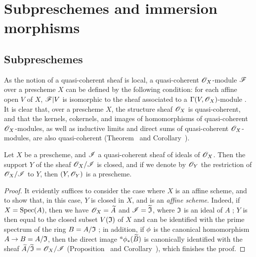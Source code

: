 \section{Subpreschemes and immersion morphisms}
\label{section-subpreschemes-and-immersion-morphisms}

\subsection{Subpreschemes}
\label{subsection-subpreschemes}

\begin{env}[4.1.1]
\label{1.4.1.1}
As the notion of a quasi-coherent sheaf  is local, a quasi-coherent $\mathscr{O}_X$-module $\mathscr{F}$ over a prescheme $X$ can be defined by the following condition: for each affine open $V$ of $X$, $\mathscr{F}|V$ is isomorphic to the sheaf associated to a $\Gamma(V,\mathscr{O}_X)$-module .
It is clear that, over a prescheme $X$, the structure sheaf $\mathscr{O}_X$ is quasi-coherent, and that the kernels, cokernels, and images of homomorphisms of quasi-coherent $\mathscr{O}_X$-modules, as well as inductive limits and direct sums of quasi-coherent $\mathscr{O}_X$-modules, are also quasi-coherent (Theorem~ and Corollary~).
\end{env}

\begin{prop}[4.1.2]
\label{1.4.1.2}
Let $X$ be a prescheme, and $\mathscr{I}$ a quasi-coherent sheaf of ideals of $\mathscr{O}_X$.
Then the support $Y$ of the sheaf $\mathscr{O}_X/\mathscr{I}$ is closed, and if we denote by $\mathscr{O}_Y$ the restriction of $\mathscr{O}_X/\mathscr{I}$ to $Y$, then $(Y,\mathscr{O}_Y)$ is a prescheme.
\end{prop}

\begin{proof}
\label{proof-1.4.1.2}
It evidently suffices  to consider the case where $X$ is an affine scheme, and to show that, in this case, $Y$ is closed in $X$, and is an \emph{affine scheme}.
Indeed, if $X={\mathop{\mathrm{Spec}}\nolimits}(A)$, then we have $\mathscr{O}_X={\widetilde{A}}$ and $\mathscr{I}={\widetilde{\mathfrak{I}}}$, where $\mathfrak{I}$ is an ideal of $A$ ;
$Y$ is then equal to the closed subset $V(\mathfrak{I})$ of $X$ and can be identified with the prime spectrum of the ring $B=A/\mathfrak{I}$ ;
in addition, if $\phi$ is the canonical homomorphism $A\to B=A/\fk{I}$, then the direct image ${}^a\phi_*({\widetilde{B}})$ is canonically identified with the sheaf ${\widetilde{A}}/{\widetilde{\mathfrak{I}}}=\mathscr{O}_X/\mathscr{I}$ (Proposition~ and Corollary~), which finishes the proof.
\end{proof}

